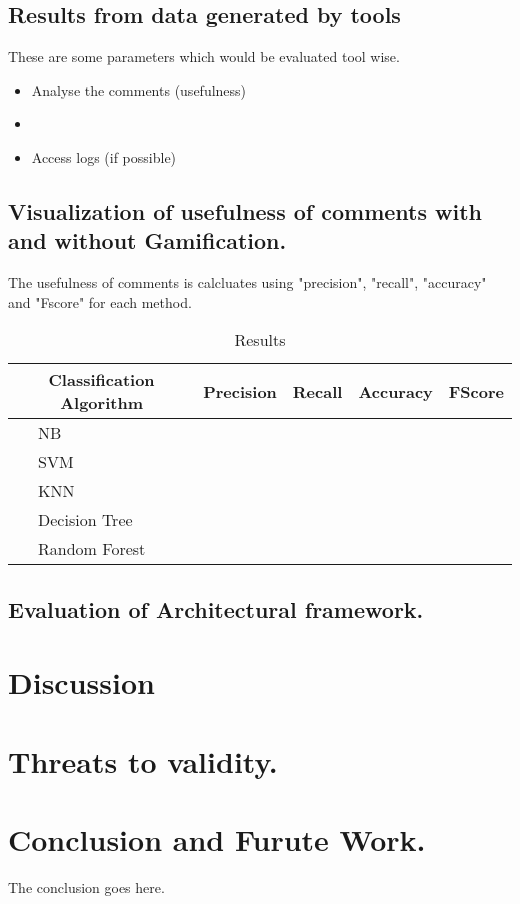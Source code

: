 \documentclass[conference]{IEEEtran}
\newcounter{magicrownumbers}
\newcommand\rownumber{\stepcounter{magicrownumbers}\arabic{magicrownumbers}}
\begin{document}
\subsection{Results from data generated by tools}
These are some parameters which would be evaluated tool wise.
\begin{itemize}
\item Analyse the comments (usefulness)
\item 
\item Access logs (if possible)
\end{itemize}


\subsection{Visualization of usefulness of comments with and without Gamification.}
The usefulness of comments is calcluates using "precision", "recall", "accuracy" and "Fscore" for each method.

\begin{table}[h]
\centering
\caption{Results}
\begin{tabular}{|c|p{2cm}|c|c|c|c|}\hline
\multicolumn{2}{|c|}{Classification Algorithm} & Precision & Recall & Accuracy & FScore  \\ \hline \hline
 \setcounter{magicrownumbers}{0}\rownumber & NB & & & &  \\ 
 \rownumber & SVM & & & & \\
 \rownumber & KNN & & & & \\
 \rownumber & Decision Tree & & & & \\
 \rownumber & Random Forest & & & & \\
 \hline
\end{tabular}
\label{tab:results}
\end{table}
\subsection{Evaluation of Architectural framework.}


\section{Discussion}



\section{Threats to validity.}


\section{Conclusion and Furute Work.}
The conclusion goes here.



\end{document}
